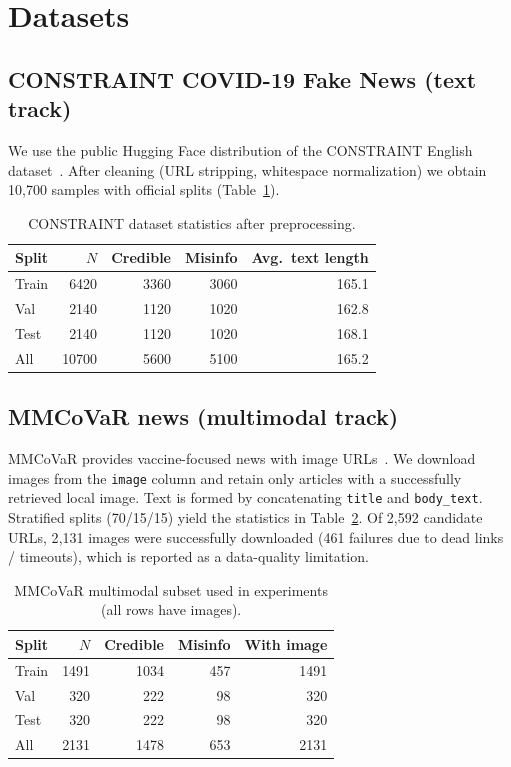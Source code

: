 \section{Datasets}

\subsection{CONSTRAINT COVID-19 Fake News (text track)}
\label{sec:constraint}

We use the public Hugging Face distribution of the CONSTRAINT English dataset~\cite{patwa2021fighting}.
After cleaning (URL stripping, whitespace normalization) we obtain 10{,}700 samples with official splits (Table~\ref{tab:constraint-stats}).

\begin{table}[H]
\centering
\caption{CONSTRAINT dataset statistics after preprocessing.}
\label{tab:constraint-stats}
\begin{tabular}{lrrrr}
\toprule
Split & $N$ & Credible & Misinfo & Avg.\ text length \\
\midrule
Train & 6420 & 3360 & 3060 & 165.1 \\
Val   & 2140 & 1120 & 1020 & 162.8 \\
Test  & 2140 & 1120 & 1020 & 168.1 \\
\midrule
All   & 10700 & 5600 & 5100 & 165.2 \\
\bottomrule
\end{tabular}
\end{table}

\subsection{MMCoVaR news (multimodal track)}
\label{sec:mmcovar}

MMCoVaR provides vaccine-focused news with image URLs~\cite{chen2021mmcovar}.
We download images from the \texttt{image} column and retain only articles with a successfully retrieved local image.
Text is formed by concatenating \texttt{title} and \texttt{body\_text}.
Stratified splits (70/15/15) yield the statistics in Table~\ref{tab:mmcovar-stats}.
Of 2{,}592 candidate URLs, 2{,}131 images were successfully downloaded (461 failures due to dead links / timeouts), which is reported as a data-quality limitation.

\begin{table}[H]
\centering
\caption{MMCoVaR multimodal subset used in experiments (all rows have images).}
\label{tab:mmcovar-stats}
\begin{tabular}{lrrrr}
\toprule
Split & $N$ & Credible & Misinfo & With image \\
\midrule
Train & 1491 & 1034 & 457 & 1491 \\
Val   & 320  & 222  & 98  & 320 \\
Test  & 320  & 222  & 98  & 320 \\
\midrule
All   & 2131 & 1478 & 653 & 2131 \\
\bottomrule
\end{tabular}
\end{table}

